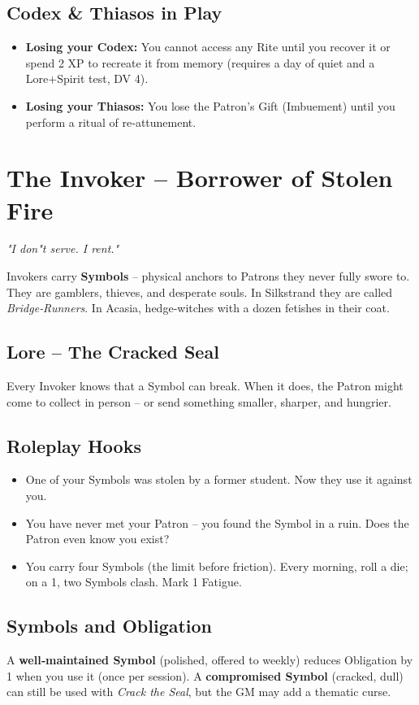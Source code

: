 \documentclass[10pt,a5paper]{book}
\begin{document}
\subsection{Codex \& Thiasos in Play}
\begin{itemize}
    \item \textbf{Losing your Codex:} You cannot access any Rite until you recover it or spend 2 XP to recreate it from memory (requires a day of quiet and a Lore+Spirit test, DV 4).
    \item \textbf{Losing your Thiasos:} You lose the Patron's Gift (Imbuement) until you perform a ritual of re‑attunement.
\end{itemize}

\section{The Invoker -- Borrower of Stolen Fire}
\textit{"I don"t serve. I rent."}

Invokers carry \textbf{Symbols} -- physical anchors to Patrons they never fully swore to. They are gamblers, thieves, and desperate souls. In Silkstrand they are called \textit{Bridge‑Runners}. In Acasia, hedge‑witches with a dozen fetishes in their coat.

\subsection{Lore -- The Cracked Seal}
Every Invoker knows that a Symbol can break. When it does, the Patron might come to collect in person -- or send something smaller, sharper, and hungrier.

\subsection{Roleplay Hooks}
\begin{itemize}
    \item One of your Symbols was stolen by a former student. Now they use it against you.
    \item You have never met your Patron -- you found the Symbol in a ruin. Does the Patron even know you exist?
    \item You carry four Symbols (the limit before friction). Every morning, roll a die; on a 1, two Symbols clash. Mark 1 Fatigue.
\end{itemize}

\subsection{Symbols and Obligation}
A \textbf{well‑maintained Symbol} (polished, offered to weekly) reduces Obligation by 1 when you use it (once per session). A \textbf{compromised Symbol} (cracked, dull) can still be used with \textit{Crack the Seal}, but the GM may add a thematic curse.
\end{document}
